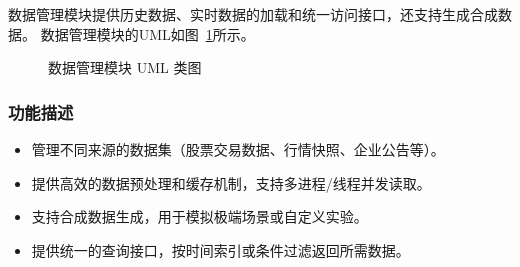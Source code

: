 数据管理模块提供历史数据、实时数据的加载和统一访问接口，还支持生成合成数据。
数据管理模块的UML如图~\ref{fig:uml_data}所示。

\begin{figure}[H]
  \centering
  \resizebox{\linewidth}{!}{}
  \caption{数据管理模块 UML 类图}
  \label{fig:uml_data}
\end{figure}


\subsubsection{功能描述}
\begin{itemize}
  \item 管理不同来源的数据集（股票交易数据、行情快照、企业公告等）。
  \item 提供高效的数据预处理和缓存机制，支持多进程/线程并发读取。
  \item 支持合成数据生成，用于模拟极端场景或自定义实验。
  \item 提供统一的查询接口，按时间索引或条件过滤返回所需数据。
\end{itemize}

